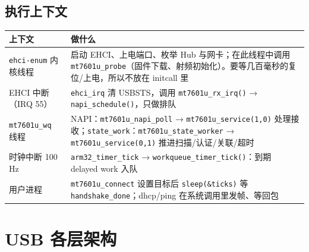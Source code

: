 \documentclass[UTF8,zihao=-4,fontset=none]{ctexart}
\newcommand{\fn}[1]{\texttt{#1}}
\begin{document}
\subsection{执行上下文}

\begin{longtable}{p{36mm}p{114mm}}
\toprule
上下文 & 做什么 \\ \midrule
\fn{ehci-enum} 内核线程 & 启动 EHCI、上电端口、枚举 Hub 与网卡；在此线程中调用 \fn{mt7601u\_probe}（固件下载、射频初始化）。要等几百毫秒的复位/上电，所以不放在 initcall 里 \\
EHCI 中断（IRQ 55） & \fn{ehci\_irq} 清 USBSTS，调用 \fn{mt7601u\_rx\_irq()} → \fn{napi\_schedule()}，只做排队 \\
\fn{mt7601u\_wq} 线程 & NAPI：\fn{mt7601u\_napi\_poll} → \fn{mt7601u\_service(1,0)} 处理接收；\fn{state\_work}：\fn{mt7601u\_state\_worker} → \fn{mt7601u\_service(0,1)} 推进扫描/认证/关联/超时 \\
时钟中断 100 Hz & \fn{arm32\_timer\_tick} → \fn{workqueue\_timer\_tick()}：到期 delayed work 入队 \\
用户进程 & \fn{mt7601u\_connect} 设置目标后 \fn{sleep(\&ticks)} 等 \fn{handshake\_done}；dhcp/ping 在系统调用里发帧、等回包 \\
\bottomrule
\end{longtable}

\section{USB 各层架构}
\end{document}
